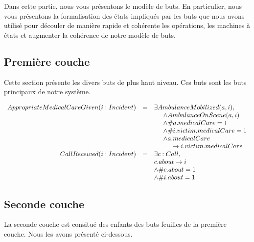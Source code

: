 Dans cette partie, nous vous présentons le modèle de buts. En 
particulier, nous vous présentons la formalisation des états impliqués
par les buts que nous avons
utilisé pour découler de manière rapide et cohérente les opérations, les
machines à états et augmenter la cohérence de notre modèle de buts.

\subsection{Première couche}

	Cette section présente les divers buts de plus haut niveau. Ces buts
	sont les buts principaux de notre système. 

	\begin{equation*}
		\begin{array}{rcl}
			AppropriateMedicalCareGiven(i:Incident)
			& = & \exists AmbulanceMobilized(a, i), \\
			&   & \hspace{0.5cm} \wedge AmbulanceOnScene(a, i) \\
			&   & \hspace{0.5cm} \wedge \#a.medicalCare = 1 \\
			&   & \hspace{0.5cm} \wedge \#i.victim.medicalCare = 1 \\
			&   & \hspace{0.5cm} \wedge a.medicalCare \\
			&   & \hspace{1cm} \rightarrow i.victim.medicalCare \\ 
			CallReceived(i:Incident)
			& = & \exists c: Call, \\
			&   & c.about \rightarrow i \\
			&   & \wedge \#c.about = 1 \\
			&   & \wedge \#i.about = 1 \\
		\end{array}
	\end{equation*}

\subsection{Seconde couche}
	
	La \og seconde couche \fg est consitué des enfants des buts
	feuilles de la première couche. Nous les avons présenté ci-dessous. 

	
